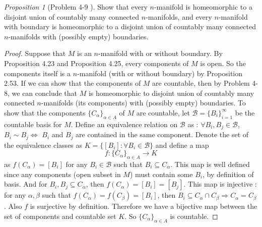 \documentclass[a4paper]{article}
\theoremstyle{remark}
\newtheorem{prop}{Proposition}
\newcommand{\subhim}{\subseteq} %
\begin{document}
\begin{prop}[Problem 4-9 \cite{LeeTM}]
	Show that every $n$-manifold is homeomorphic to a disjoint union of countably many connected $n$-manifolds, and every $n$-manifold with boundary is homeomorphic to a disjoint union of countably many connected $n$-manifolds with (possibly empty) boundaries.
\end{prop}
\begin{proof}
	Suppose that $M$ is an $n$-manifold with or without boundary. By Proposition 4.23 and Proposition 4.25, every components of $M$ is open. So the components itself is a $n$-manifold (with or without boundary) by Proposition 2.53. If we can show that the components of $M$ are countable, then by Problem 4-8, we can conclude that $M$ is homeomorphic to disjoint union of countably many connected $n$-manifolds (its components) with (possibly empty) boundaries.
	To show that the components $\{C_{\alpha}\}_{\alpha \in A}$ of $M$ are countable, let $\mathcal{B}=\{B_i\}_{i=1}^{\infty}$ be the countable basis for $M$. Define an equivalence relation on $\mathcal{B}$ as  : $\forall B_i,B_j \in \mathcal{B}$, $B_i {\sim} B_j \Leftrightarrow $ $B_i$ and $B_j$ are contained in the same component. Denote the set of the equivalence classes as $K = \{[B_i]: \forall B_i \in \mathcal{B}\}$ and define a map
	$$
	f : \{C_{\alpha}\}_{\alpha \in A} \to K
	$$
	as $f(C_{\alpha}) = [B_i]$ for any $B_i \in \mathcal{B}$ such that $B_i \subhim C_{\alpha}$. This map is well defined since any components (open subset in $M$) must contain some $B_i$, by definition of basis. And for $B_i,B_j \subhim C_{\alpha}$, then $f(C_{\alpha}) = [B_i]=[B_j]$. This map is injective : for any $\alpha, \beta$ such that $f(C_{\alpha}) = f(C_{\beta}) = [B_i]$, then $B_i \subhim C_{\alpha} \cap C_{\beta} \Rightarrow C_{\alpha} = C_{\beta}$. Also $f$ is surjective by definition. Therefore we have a bijective map between the set of components and countable set $K$. So $\{C_{\alpha}\}_{\alpha \in A}$ is countable. 
	
\end{proof}
\end{document}
